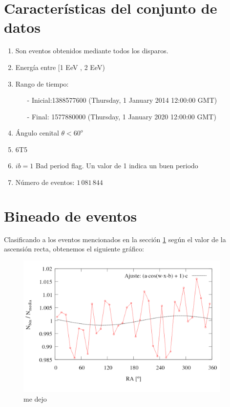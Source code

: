 	\section{Características del conjunto de datos} \label{specs}
		
		\begin{enumerate}
			\item Son eventos obtenidos mediante todos los disparos.
			\item Energía entre  [1 EeV , 2 EeV)
			\item Rango de tiempo:
			\begin{itemize}
				\item[-] Inicial:1388577600 (Thursday, 1 January 2014 12:00:00 GMT)
				\item[-] Final: 1577880000  (Thursday, 1 January 2020 12:00:00 GMT)
			\end{itemize}
			\item Ángulo cenital $\theta < 60^o$
			\item 6T5
			\item $ib=1$ Bad period flag. Un valor de 1 indica un buen periodo
			\item Número de eventos: $1\,081\,844$
		\end{enumerate}


\section{Bineado de eventos}

Clasificando a los eventos mencionados en la sección \ref{specs} según el valor de la ascensión recta, obtenemos el siguiente gráfico: 
\begin{figure}[H]
	\centering
	\includegraphics[width=0.95\textwidth]{bineado_eventos_herald_por_RA.png}
	\caption{me dejo}
\end{figure}

